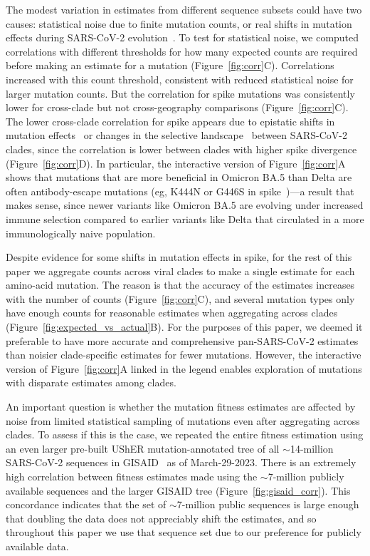 \documentclass[9pt,twocolumn,twoside]{gsajnl_modified}
\begin{document}
The modest variation in estimates from different sequence subsets could have two causes: statistical noise due to finite mutation counts, or real shifts in mutation effects during SARS-CoV-2 evolution~\citep{starr2022shifting,moulana2022compensatory}.
To test for statistical noise, we computed correlations with different thresholds for how many expected counts are required before making an estimate for a mutation (Figure~\ref{fig:corr}C).
Correlations increased with this count threshold, consistent with reduced statistical noise for larger mutation counts.
But the correlation for spike mutations was consistently lower for cross-clade but not cross-geography comparisons (Figure~\ref{fig:corr}C).
The lower cross-clade correlation for spike appears due to epistatic shifts in mutation effects~\citep{starr2022shifting, moulana2022compensatory, pollock2012amino, shah2015contingency, lee2018deep} or changes in the selective landscape~\citep{sun2023rapidly} between SARS-CoV-2 clades, since the correlation is lower between clades with higher spike divergence (Figure~\ref{fig:corr}D).
In particular, the interactive version of Figure~\ref{fig:corr}A shows that mutations that are more beneficial in Omicron BA.5 than Delta are often antibody-escape mutations (eg, K444N or G446S in spike~\citep{greaney2022antibody})---a result that makes sense, since newer variants like Omicron BA.5 are evolving under increased immune selection compared to earlier variants like Delta that circulated in a more immunologically naive population.

Despite evidence for some shifts in mutation effects in spike, for the rest of this paper we aggregate counts across viral clades to make a single estimate for each amino-acid mutation.
The reason is that the accuracy of the estimates increases with the number of counts (Figure~\ref{fig:corr}C), and several mutation types only have enough counts for reasonable estimates when aggregating across clades (Figure~\ref{fig:expected_vs_actual}B).
For the purposes of this paper, we deemed it preferable to have more accurate and comprehensive pan-SARS-CoV-2 estimates than noisier clade-specific estimates for fewer mutations.
However, the interactive version of Figure~\ref{fig:corr}A linked in the legend enables exploration of mutations with disparate estimates among clades.

An important question is whether the mutation fitness estimates are affected by noise from limited statistical sampling of mutations even after aggregating across clades.
To assess if this is the case, we repeated the entire fitness estimation using an even larger pre-built UShER mutation-annotated tree of all $\sim$14-million SARS-CoV-2 sequences in GISAID~\cite{shu2017gisaid} as of March-29-2023.
There is an extremely high correlation between fitness estimates made using the $\sim$7-million publicly available sequences and the larger GISAID tree (Figure~\ref{fig:gisaid_corr}).
This concordance indicates that the set of $\sim$7-million public sequences is large enough that doubling the data does not appreciably shift the estimates, and so throughout this paper we use that sequence set due to our preference for publicly available data.
\end{document}
